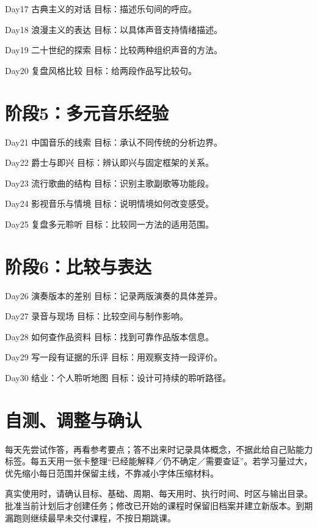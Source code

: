 \documentclass[11pt]{article}
\newcommand{\Needspace}[1]{\par\ifdim\dimexpr\pagegoal-\pagetotal\relax<#1\relax\newpage\fi}
\begin{document}
Day17  古典主义的对话
目标：描述乐句间的呼应。

Day18  浪漫主义的表达
目标：以具体声音支持情绪描述。

Day19  二十世纪的探索
目标：比较两种组织声音的方法。

Day20  复盘风格比较
目标：给两段作品写比较句。

\Needspace{5\baselineskip}\section*{阶段5：多元音乐经验}

Day21  中国音乐的线索
目标：承认不同传统的分析边界。

Day22  爵士与即兴
目标：辨认即兴与固定框架的关系。

Day23  流行歌曲的结构
目标：识别主歌副歌等功能段。

Day24  影视音乐与情境
目标：说明情境如何改变感受。

Day25  复盘多元聆听
目标：比较同一方法的适用范围。

\Needspace{5\baselineskip}\section*{阶段6：比较与表达}

Day26  演奏版本的差别
目标：记录两版演奏的具体差异。

Day27  录音与现场
目标：比较空间与制作影响。

Day28  如何查作品资料
目标：找到可靠作品版本信息。

Day29  写一段有证据的乐评
目标：用观察支持一段评价。

Day30  结业：个人聆听地图
目标：设计可持续的聆听路径。

\Needspace{5\baselineskip}\section*{自测、调整与确认}

每天先尝试作答，再看参考要点；答不出来时记录具体概念，不据此给自己贴能力标签。每五天用一张卡整理“已经能解释／仍不确定／需要查证”。若学习量过大，优先缩小每日范围并保留主线，不靠减小字体压缩材料。

真实使用时，请确认目标、基础、周期、每天用时、执行时间、时区与输出目录。批准当前计划后才创建任务；修改已开始的课程时保留旧档案并建立新版本。到期漏跑则继续最早未交付课程，不按日期跳课。
\end{document}
